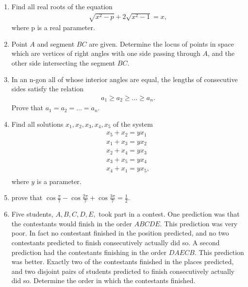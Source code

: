 \documentclass{article}
\begin{document}
\begin{enumerate}

\item Find all real roots of the equation
	\begin{align*}
		\sqrt{x^2-p}+2\sqrt{x^2-1}=x,
        \end{align*} where p is a real parameter.
\item Point $A$ and segment $BC$ are given. Determine the locus of points in space which are vertices of right angles with one side passing through $A$, and the other side intersecting the segment $BC$.
\item In an n-gon all  of whose interior angles are equal, the lengths of consecutive sides satisfy the relation \begin{align*}
a_{1}\ge a_{2} \ge \ldots \ge a_{n}.
\end{align*} Prove that $a_1=a_2=\ldots=a_n$.
\item Find all solutions $x_1, x_2, x_3, x_4, x_5$ of the system \begin{align*}
		x_5+x_2=yx_1\\
		x_1+x_3=yx_2\\
		x_2+x_4=yx_3\\
		x_3+x_5=yx_4\\
		x_4+x_1=yx_5,\\
\end{align*}
where $y$ is a parameter.
\item prove that $\cos \frac{\pi}{7}-\cos \frac{2\pi}{7}+\cos \frac{3\pi}{7}=\frac{1}{2}$.
\item Five students, $A, B, C, D, E,$ took part in a contest. One prediction was that the contestants would finish in the order $ABCDE$. This prediction was very poor. In fact no contestant finished in the position predicted, and no two contestants predicted to finish consecutively actually did so. A second prediction had the contestants finishing in the order $DAECB$. This prediction was better. Exactly two of the contestants finished in the places predicted, and two disjoint pairs of students predicted to finish consecutively actually did so. Determine the order in which the contestants finished.
\end{enumerate}
\end{document}
